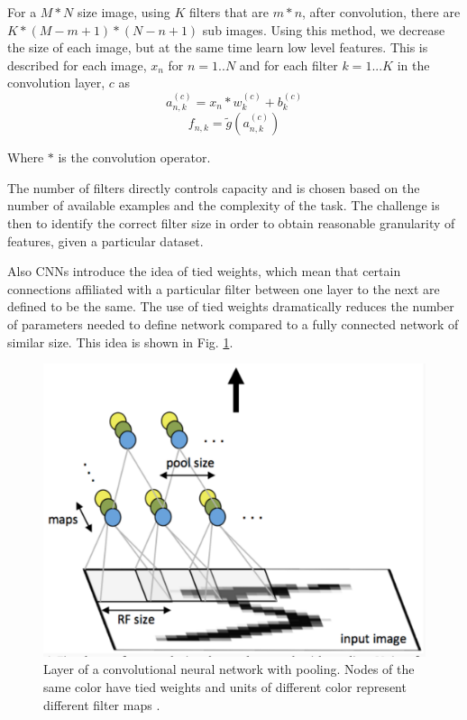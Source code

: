 \documentclass[12pt, twocolumn]{article}
\begin{document}
 For a  $M * N $ size image, using $K$ filters that are $m * n$,  after convolution, there are  $ K * (M - m + 1) * (N - n + 1) $ sub images. Using this method, we decrease the size of each image, but at the same time learn low level features. This is described for each image, $x_n$ for $n=1..N$ and for each filter $k=1...K$ in the convolution layer, $c$ as
\begin{equation}
a_{n,k}^{(c)}= x_n \ast w_k^{(c)} + b_k^{(c)}
\end{equation}
\begin{equation}
f_{n,k}= \tilde{g}(a_{n,k}^{(c)})
\end{equation}
 
 Where $\ast$ is the convolution operator. 
 
 The number of filters directly controls capacity and is chosen based on the number of available examples and the complexity of the task. The challenge is then to identify the correct filter size in order to obtain reasonable granularity of features, given a particular dataset.

Also CNNs introduce the idea of tied weights, which mean that certain connections affiliated with a particular filter between one layer to the next are defined to be the same. The use of tied weights dramatically reduces the number of parameters needed to define network compared to a fully connected network of similar size. This idea is shown in Fig. \ref{fig:conv}.



\begin{figure}
\includegraphics[scale=.4]{convgraphic.png}

\caption{Layer of a convolutional neural network with pooling. Nodes of the same color have tied weights and units of different color represent different filter maps \cite{StanfordTut}. }
\label{fig:conv}
\end{figure}
\end{document}
